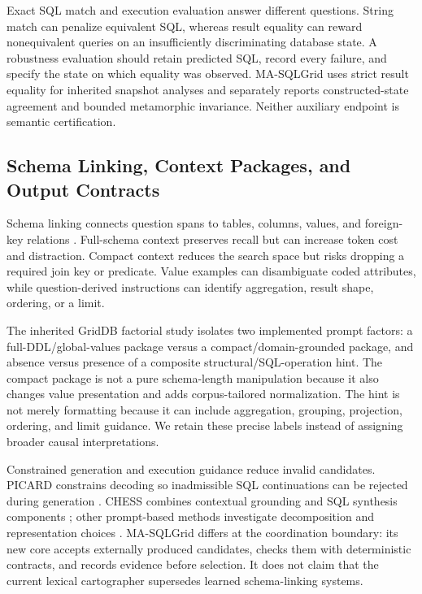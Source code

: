 \documentclass[applsci,article,submit,moreauthors]{Definitions/mdpi}
\newcommand{\masql}{MA-SQLGrid}
\begin{document}
Exact SQL match and execution evaluation answer different questions. String match can penalize equivalent SQL, whereas result equality can reward nonequivalent queries on an insufficiently discriminating database state. A robustness evaluation should retain predicted SQL, record every failure, and specify the state on which equality was observed. \masql{} uses strict result equality for inherited snapshot analyses and separately reports constructed-state agreement and bounded metamorphic invariance. Neither auxiliary endpoint is semantic certification.

\subsection{Schema Linking, Context Packages, and Output Contracts}

Schema linking connects question spans to tables, columns, values, and foreign-key relations \cite{wang2020ratsql,lei2020reexamining,liu2022semantic}. Full-schema context preserves recall but can increase token cost and distraction. Compact context reduces the search space but risks dropping a required join key or predicate. Value examples can disambiguate coded attributes, while question-derived instructions can identify aggregation, result shape, ordering, or a limit.

The inherited GridDB factorial study isolates two implemented prompt factors: a full-DDL/global-values package versus a compact/domain-grounded package, and absence versus presence of a composite structural/SQL-operation hint. The compact package is not a pure schema-length manipulation because it also changes value presentation and adds corpus-tailored normalization. The hint is not merely formatting because it can include aggregation, grouping, projection, ordering, and limit guidance. We retain these precise labels instead of assigning broader causal interpretations.

Constrained generation and execution guidance reduce invalid candidates. PICARD constrains decoding so inadmissible SQL continuations can be rejected during generation \cite{scholak2021picard}. CHESS combines contextual grounding and SQL synthesis components \cite{talaei2024chess}; other prompt-based methods investigate decomposition and representation choices \cite{nan2023enhancing,sun2023sqlprompt,pourreza2023dinsql}. \masql{} differs at the coordination boundary: its new core accepts externally produced candidates, checks them with deterministic contracts, and records evidence before selection. It does not claim that the current lexical cartographer supersedes learned schema-linking systems.
\end{document}
